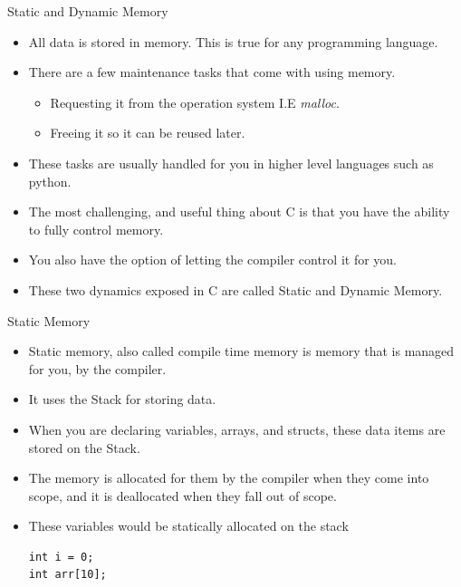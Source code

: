 \documentclass{beamer}
\begin{document}
\begin{frame}{Static and Dynamic Memory}
	\begin{itemize}[<+->]
		\item All data is stored in memory. This is true for any programming language.
		\item There are a few maintenance tasks that come with using memory.
		\begin{itemize}[<+->]
			\item Requesting it from the operation system I.E {\it malloc}.
			\item Freeing it so it can be reused later.
		\end{itemize}
		\item These tasks are usually handled for you in higher level languages such as python.
		\item The most challenging, and useful thing about C is that you have the ability to fully control memory.
		\item You also have the option of letting the compiler control it for you.
		\item These two dynamics exposed in C are called Static and Dynamic Memory.
	\end{itemize}
\end{frame}

\begin{frame}[fragile]{Static Memory}
	\begin{itemize}[<+->]
		\item Static memory, also called compile time memory is memory that is managed for you, by the compiler.
		\item It uses the Stack for storing data.
		\item When you are declaring variables, arrays, and structs, these data items are stored on the Stack.
		\item The memory is allocated for them by the compiler when they come into scope, and it is deallocated when they fall out of scope.
		\item These variables would be statically allocated on the stack
		\begin{verbatim}
int i = 0;
int arr[10];
\end{verbatim}
	\end{itemize}
\end{frame}
\end{document}
